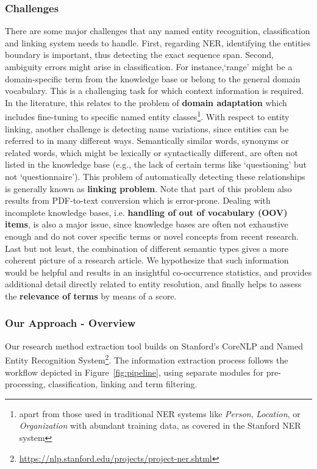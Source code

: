 \subsubsection{Challenges}
There are some major challenges that any named entity recognition, classification and linking system needs to handle.
First, regarding NER, identifying the entities boundary is important, thus detecting the exact sequence span. 
Second, ambiguity errors might arise in classification. For instance,`range' might be a domain-specific term from the knowledge base or belong to the general domain vocabulary. This is a challenging task for which context information is required. 
In the literature, this relates to the problem of \textbf{domain adaptation} which includes fine-tuning to specific named entity classes\footnote{apart from those used in traditional NER systems like \textit{Person}, \textit{Location}, or \textit{Organization} with abundant training data, as covered in the Stanford NER system\cite{finkel2005incorporating}}.
With respect to entity linking, another challenge is detecting name variations, since entities can be referred to in many different ways.
Semantically similar words, synonyms or related words, which might be lexically or syntactically different, are often not listed in the knowledge base 
(e.g., the lack of certain terms like `questioning' but not `questionnaire'). This problem of automatically detecting these relationships is generally known as \textbf{linking problem}. 
Note that part of this problem also results from PDF-to-text conversion which is error-prone. 
Dealing with incomplete knowledge bases, i.e. \textbf{handling of out of vocabulary (OOV) items}, is also a major issue, since 
knowledge bases are often not exhaustive enough and do not cover specific terms or novel concepts from recent research.
Last but not least, the combination of different semantic types gives a more coherent picture of a research article. We hypothesize that such information would be helpful and results in an insightful co-occurrence statistics, and provides additional detail directly related to entity resolution, and finally helps to assess the \textbf{relevance of terms} by means of a score.

 
\subsubsection{Our Approach - Overview} 
Our research method extraction tool builds on Stanford’s CoreNLP and Named Entity Recognition System\footnote{\url{https://nlp.stanford.edu/projects/project-ner.shtml}}. 
The information extraction process follows the workflow depicted in Figure~\ref{fig:pipeline}, using separate modules for pre-processing, classification, linking and term filtering.

